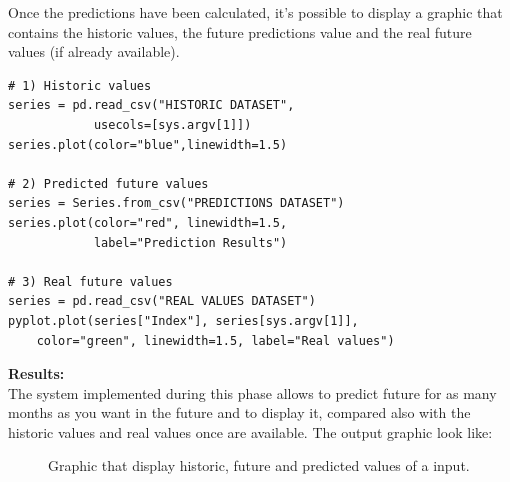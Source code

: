 Once the predictions have been calculated, it's possible to display a graphic that contains the historic values, the future predictions value and the real future values (if already available).
\begin{lstlisting}
# 1) Historic values
series = pd.read_csv("HISTORIC DATASET", 
			usecols=[sys.argv[1]])
series.plot(color="blue",linewidth=1.5)

# 2) Predicted future values
series = Series.from_csv("PREDICTIONS DATASET")
series.plot(color="red", linewidth=1.5, 
			label="Prediction Results")

# 3) Real future values
series = pd.read_csv("REAL VALUES DATASET")
pyplot.plot(series["Index"], series[sys.argv[1]],
	color="green", linewidth=1.5, label="Real values")

\end{lstlisting}

\newpage 

\textbf{Results:}\\
The system implemented during this phase allows to predict future for as many months as you want in the future and to display it, compared also with the historic values and real values once are available. The output graphic look like:
\begin{figure}[H]
	\centering
    \caption{Graphic that display historic, future and predicted values of a input.}
\end{figure}

\newpage




